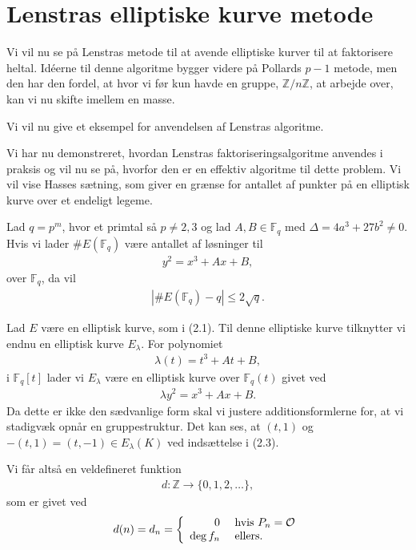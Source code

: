 \section{Lenstras elliptiske kurve metode}

Vi vil nu se på Lenstras metode til at avende
elliptiske kurver til at faktorisere heltal. 
Idéerne til denne algoritme bygger videre på
Pollards $p-1$ metode, men den har den fordel, at 
hvor vi før kun havde en gruppe, $\mathbb{Z} / n \mathbb{Z}$,
at arbejde over, kan vi nu skifte imellem en masse.


\begin{example}
Vi vil nu give et eksempel for anvendelsen af Lenstras algoritme.
\end{example}


Vi har nu demonstreret, hvordan Lenstras faktoriseringsalgoritme 
anvendes i praksis og vil nu se på, hvorfor den er en effektiv algoritme
til dette problem. Vi vil vise Hasses sætning, som giver en grænse 
for antallet af punkter på en elliptisk kurve over et endeligt
legeme.


\begin{theorem}
Lad $q = p^m$, hvor et primtal så $p \neq 2, 3$ og lad 
$A, B \in \mathbb{F}_q$ med $\Delta = 4a^3 + 27b^2 \neq 0$.
Hvis vi lader $\#E(\mathbb{F}_q)$ være antallet af løsninger
til 
\begin{align}
	y^2 = x^3 + Ax + B,
\end{align}
over $\mathbb{F}_q$, da vil
\begin{align}
	| \#E(\mathbb{F}_q) - q | \leq 2 \sqrt{q}.
\end{align}
\end{theorem}
Lad $E$ være en elliptisk kurve, som i (2.1). Til denne elliptiske
kurve tilknytter vi endnu en elliptisk kurve $E_\lambda$. For polynomiet 
\begin{align*}
	\lambda(t) = t^3 + At + B,
\end{align*}	
i $\mathbb{F}_q[t]$ lader vi $E_{\lambda}$ være en elliptisk kurve
over $\mathbb{F}_q(t)$ givet ved
\begin{align}
	\lambda y^2 = x^3 + Ax + B.
\end{align}
Da dette er ikke den sædvanlige form skal vi justere additionsformlerne
for, at vi stadigvæk opnår en gruppestruktur. Det kan ses, at 
$(t, 1)$ og $-(t, 1)=(t, -1) \in E_{\lambda}(K)$ ved indsættelse i (2.3).


Vi får altså en veldefineret funktion 
\begin{align*}
	d : \mathbb{Z} \to \{0, 1, 2, \ldots \},
\end{align*}
som er givet ved
\begin{align*}
	d(n) = d_n = \left\{ \begin{array}{rl}
		0 &\mbox{ hvis $P_n = \mathcal{O}$} \\
		\deg f_n &\mbox{ ellers.}
	\end{array} \right.
\end{align*}


